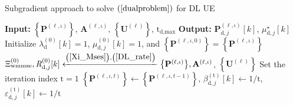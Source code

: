 \documentclass[9pt,journal]{IEEEtran}
\newcommand{\paren}[1]{\left({#1}\right)}
\newcommand{\bracket}[1]{{\left [{#1}\right ]}}
\newcommand{\braces}[1]{{\left\{ {#1}\right\}}}
\newcommand{\sfrac}[2]{#1/#2}
\theoremstyle{definition}
\begin{document}
	\begin{algorithm}[ht!]
		\caption{Subgradient approach to solve $\paren{\ref{dualproblem}}$ for DL UE}
		\label{DLalgorithm}
		\begin{algorithmic}[1]
			\Statex \textbf{Input: } $\braces{\mathbf{P}^{\paren{\mathrm{\ell,\iota}}}}$,  $\mathbf{A}^{\paren{\mathrm{\ell,\iota}}}$, $\braces{\mathbf{U}^{\paren{\mathrm{\ell}}}}$, $\mathrm{t}_{\textrm{d,max}}$
			\Statex \textbf{Output:} $\mathbf{P}^{\paren{\mathrm{\ell,\iota}}}_{\textrm{d},j}\bracket{k}$, $\mu^\star_{\textrm{d},j}\bracket{k}$
			\State Initialize $\lambda^{\paren{\mathrm{0}}}_{\textrm{d}}\bracket{k}=1$, $\mu^{\paren{\mathrm{0}}}_{\textrm{d},j}\bracket{k}=1$, and $\braces{\mathbf{P}^{\paren{\ell,\iota,0}}}=\braces{\mathbf{P}^{\paren{\mathrm{\ell,\iota}}}}$ 
			\State $\Xi^{\paren{\mathrm{0}}}_{\textrm{wmmse}},\mathit{R}^{\paren{\mathrm{0}}}_{\textrm{d},j}\bracket{k}\xleftarrow{\paren{\mathrm{\ref{Xi_Mses}}},\paren{\mathrm{\ref{DL_rate}}}}\braces{\mathbf{P}^{\paren{\mathrm{\ell,\iota}}}},\mathbf{A}^{\paren{\mathrm{\ell,\iota}}}$, $\braces{\mathbf{U}^{\paren{\mathrm{\ell}}}}$
			\State Set the iteration index $\mathrm{t}=1$
			\Repeat
			\State $\braces{\mathbf{P}^{\paren{\ell,\iota,t}}}\leftarrow\braces{\mathbf{P}^{\paren{\ell,\iota,t-1}}}$, $\beta^{\paren{\mathrm{t}}}_{\textrm{d},j}\bracket{k}\leftarrow\sfrac{1}{\mathrm{t}}$, $\varepsilon^{\paren{\mathrm{t}}}_{\textrm{d},j}\bracket{k}\leftarrow\sfrac{1}{\mathrm{t}}$

\end{algorithmic}
\end{algorithm}
\end{document}
